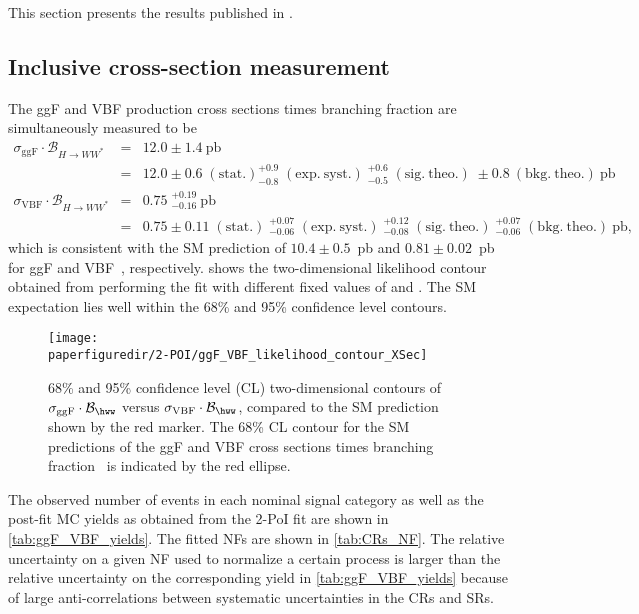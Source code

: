 This section presents the results published in .

\subsection{Inclusive cross-section measurement}
The ggF and VBF production cross sections times branching fraction are simultaneously measured to be
\begin{eqnarray*}
  \sigma_{\mathrm{ggF}} \cdot \mathcal{B}_{H \to WW^{\ast}} &=& 12.0 \pm 1.4~\mathrm{pb} \\
  &=& 12.0 \pm 0.6\;(\mathrm{stat.}) ^{+0.9}_{-0.8}\;(\mathrm{exp.~syst.})\;^{+0.6}_{-0.5}\;(\mathrm{sig.~theo.})\; \pm 0.8~(\mathrm{bkg.~theo.})~\mathrm{pb} \\
  \sigma_{\mathrm{VBF}} \cdot \mathcal{B}_{H \to WW^{\ast}} &=& 0.75\;^{+0.19}_{-0.16}~\mathrm{pb} \\
  &=& 0.75 \pm 0.11\;(\mathrm{stat.})\;^{+0.07}_{-0.06}\;(\mathrm{exp.~syst.})\;^{+0.12}_{-0.08}\;(\mathrm{sig.~theo.})\;^{+0.07}_{-0.06}\;(\mathrm{bkg.~theo.})~\mathrm{pb},
\end{eqnarray*}
which is consistent with the SM prediction of $10.4\pm 0.5$~pb and $0.81\pm 0.02$~pb for ggF and VBF~\cite{deFlorian:2016spz}, respectively.
 shows the two-dimensional likelihood contour obtained from performing the fit with different fixed values of \muGGF and \muVBF. The SM expectation lies well within the 68\% and 95\% confidence level contours.
\begin{figure}[htb]
  \centering
  \texttt{[image: \\paperfiguredir/2-POI/ggF\_VBF\_likelihood\_contour\_XSec]}
  \caption{
    68\% and 95\% confidence level (CL) two-dimensional contours of $\sigma_{\mathrm{ggF}} \cdot \mathcal{B}_{\hww}$ versus \mbox{$\sigma_{\mathrm{VBF}}\cdot\mathcal{B}_{\hww}$}, compared to the SM prediction shown by the red marker.
    The 68\% CL contour for the SM predictions of the ggF and VBF cross sections times branching fraction~\cite{deFlorian:2016spz} is indicated by the red ellipse.
    \label{fig:LL2D}
  }
\end{figure}
The observed number of events in each nominal signal category as well as the post-fit MC yields as obtained from the 2-PoI fit are shown in \cref{tab:ggF_VBF_yields}.
The fitted NFs are shown in \cref{tab:CRs_NF}.
The relative uncertainty on a given NF used to normalize a certain process is larger than the relative uncertainty on the corresponding yield in \cref{tab:ggF_VBF_yields} because of large anti-correlations between systematic uncertainties in the CRs and SRs. 
